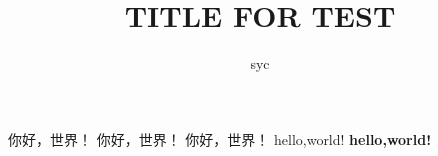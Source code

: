 \documentclass[a4paper, 12pt, fontset=windows, draft]{ctexbook}
\title{TITLE FOR TEST}
\author{syc}
\begin{document}

你好，世界！
你好，世界！
\clearpage
你好，世界！
hello,world!
\bf
hello,world!
\end{document}
